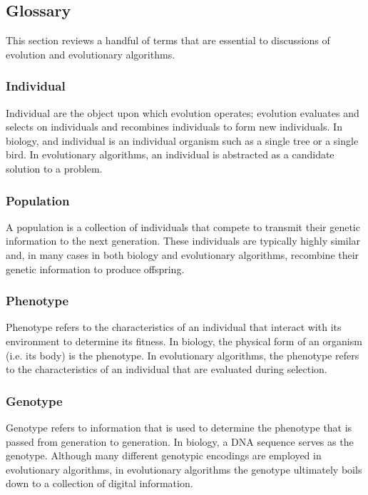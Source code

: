 \subsection{Glossary}

This section reviews a handful of terms that are essential to discussions of evolution and evolutionary algorithms.

\subsubsection{Individual}

Individual are the object upon which evolution operates; evolution evaluates and selects on individuals and recombines individuals to form new individuals. In biology, and individual is an individual organism such as a single tree or a single bird. In evolutionary algorithms, an individual is abstracted as a candidate solution to a problem.

\subsubsection{Population}

A population is a collection of individuals that compete to transmit their genetic information to the next generation. These individuals are typically highly similar and, in many cases in both biology and evolutionary algorithms, recombine their genetic information to produce offspring.

\subsubsection{Phenotype}

Phenotype refers to the characteristics of an individual that interact with its environment to determine its fitness. In biology, the physical form of an organism (i.e. its body) is the phenotype. In evolutionary algorithms, the phenotype refers to the characteristics of an individual that are evaluated during selection.

\subsubsection{Genotype}

Genotype refers to information that is used to determine the phenotype that is passed from generation to generation. In biology, a DNA sequence serves as the genotype. Although many different genotypic encodings are employed in evolutionary algorithms, in evolutionary algorithms the genotype ultimately boils down to a collection of digital information.

